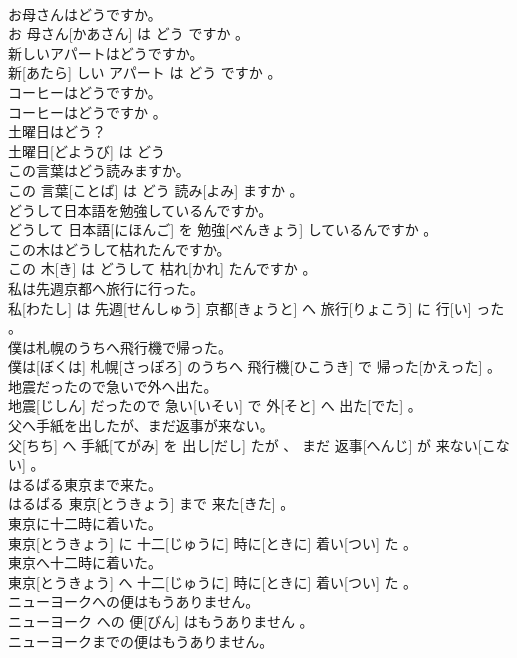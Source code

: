 \documentclass[8pt]{extreport}
\begin{document}
\begin{CJK}{UTF8}{min}
\\	お母さんはどうですか。	
\\	お 母さん[かあさん] は どう ですか 。
\\	新しいアパートはどうですか。	
\\	新[あたら] しい アパート は どう ですか 。
\\	コーヒーはどうですか。	
\\	コーヒーはどうですか 。
\\	土曜日はどう？	
\\	土曜日[どようび] は どう 
\\	この言葉はどう読みますか。	
\\	この 言葉[ことば] は どう 読み[よみ] ますか 。
\\	どうして日本語を勉強しているんですか。	
\\	どうして 日本語[にほんご] を 勉強[べんきょう] しているんですか 。
\\	この木はどうして枯れたんですか。	
\\	この 木[き] は どうして 枯れ[かれ] たんですか 。
\\	私は先週京都へ旅行に行った。	
\\	私[わたし] は 先週[せんしゅう] 京都[きょうと] へ 旅行[りょこう] に 行[い] った 。
\\	僕は札幌のうちへ飛行機で帰った。	
\\	僕は[ぼくは] 札幌[さっぽろ] のうちへ 飛行機[ひこうき] で 帰った[かえった] 。
\\	地震だったので急いで外へ出た。	
\\	地震[じしん] だったので 急い[いそい] で 外[そと] へ 出た[でた] 。
\\	父へ手紙を出したが、まだ返事が来ない。	
\\	父[ちち] へ 手紙[てがみ] を 出し[だし] たが 、 まだ 返事[へんじ] が 来ない[こない] 。
\\	はるばる東京まで来た。	
\\	はるばる 東京[とうきょう] まで 来た[きた] 。
\\	東京に十二時に着いた。	
\\	東京[とうきょう] に 十二[じゅうに] 時に[ときに] 着い[つい] た 。
\\	東京へ十二時に着いた。	
\\	東京[とうきょう] へ 十二[じゅうに] 時に[ときに] 着い[つい] た 。
\\	ニューヨークへの便はもうありません。	
\\	ニューヨーク への 便[びん] はもうありません 。
\\	ニューヨークまでの便はもうありません。	

\end{CJK}
\end{document}
